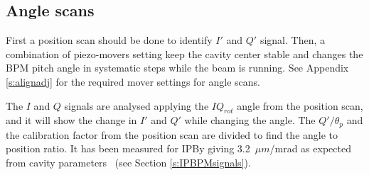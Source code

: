\subsection{Angle scans}
First a position scan should be done to identify $I'$ and $Q'$ signal. Then, a combination of piezo-movers setting keep the cavity center stable and changes the BPM pitch angle in systematic steps while the beam is running. See Appendix \ref{s:alignadj} for the required mover settings for angle scans.\par
The $I$ and $Q$ signals are analysed applying the $IQ_{rot}$ angle from the position scan, and it will show the change in $I'$ and $Q'$ while changing the angle. The $Q'/\theta_p$ and the calibration factor from the position scan are divided to find the angle to position ratio. It has been measured for IPBy giving 3.2~$\mu m$/mrad as expected from cavity parameters~\cite{Neven2014} (see Section \ref{s:IPBPMsignals}).\par

